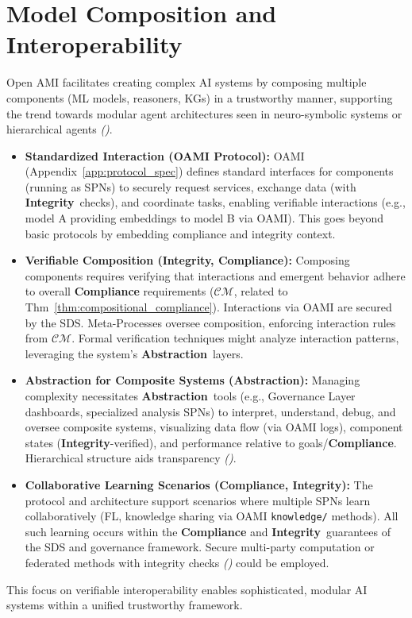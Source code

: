 \documentclass[12pt,a4paper]{report}
\renewcommand{\citep}[1]{\textit{\scriptsize{(\cite{#1})}}}
\newcommand{\Compliance}{\textbf{Compliance}}
\newcommand{\Integrity}{\textbf{Integrity}}
\newcommand{\Abstraction}{\textbf{Abstraction}}
\begin{document}
	\section{Model Composition and Interoperability} %
	\label{sec:3-8} %
	
	Open AMI facilitates creating complex AI systems by composing multiple components (ML models, reasoners, KGs) in a trustworthy manner, supporting the trend towards modular agent architectures seen in neuro-symbolic systems or hierarchical agents \citep{AdditionalCitationRef52}.
	
	\begin{itemize}
		\item \textbf{Standardized Interaction (OAMI Protocol):} OAMI (Appendix~\ref{app:protocol_spec}) defines standard interfaces for components (running as SPNs) to securely request services, exchange data (with \Integrity\ checks), and coordinate tasks, enabling verifiable interactions (e.g., model A providing embeddings to model B via OAMI). This goes beyond basic protocols by embedding compliance and integrity context.
		\item \textbf{Verifiable Composition (\Integrity, \Compliance):} Composing components requires verifying that interactions and emergent behavior adhere to overall \textbf{Compliance} requirements ($\mathcal{CM}$, related to Thm~\ref{thm:compositional_compliance}). Interactions via OAMI are secured by the SDS. Meta-Processes oversee composition, enforcing interaction rules from $\mathcal{CM}$. Formal verification techniques might analyze interaction patterns, leveraging the system's \Abstraction\ layers.
		\item \textbf{Abstraction for Composite Systems (\Abstraction):} Managing complexity necessitates \Abstraction\ tools (e.g., Governance Layer dashboards, specialized analysis SPNs) to interpret, understand, debug, and oversee composite systems, visualizing data flow (via OAMI logs), component states (\Integrity-verified), and performance relative to goals/\textbf{Compliance}. Hierarchical structure aids transparency \citep{AdditionalCitationRef52}.
		\item \textbf{Collaborative Learning Scenarios (\Compliance, Integrity):} The protocol and architecture support scenarios where multiple SPNs learn collaboratively (FL, knowledge sharing via OAMI \texttt{knowledge/} methods). All such learning occurs within the \textbf{Compliance} and \Integrity\ guarantees of the SDS and governance framework. Secure multi-party computation or federated methods with integrity checks \citep{AdditionalCitationRef54, Citadel_PlusPlus_2025} could be employed.
	\end{itemize}
	This focus on verifiable interoperability enables sophisticated, modular AI systems within a unified trustworthy framework.
	
\end{document}
